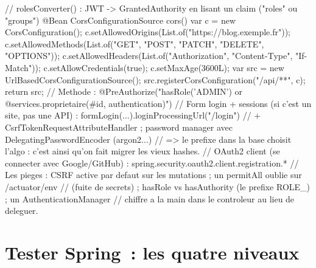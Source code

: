 \documentclass[12pt,a4paper,twoside,openright]{book}
\begin{document}
\begin{codejava}
{    // rolesConverter() : JWT -> GrantedAuthority en lisant un claim ("roles" ou "groups")
    @Bean
    CorsConfigurationSource cors() {
        var c = new CorsConfiguration();
        c.setAllowedOrigins(List.of("https://blog.exemple.fr"));
        c.setAllowedMethods(List.of("GET", "POST", "PATCH", "DELETE", "OPTIONS"));
        c.setAllowedHeaders(List.of("Authorization", "Content-Type", "If-Match"));
        c.setAllowCredentials(true); c.setMaxAge(3600L);
        var src = new UrlBasedCorsConfigurationSource(); src.registerCorsConfiguration("/api/**", c); return src;
    }
}
// Methode : @PreAuthorize("hasRole('ADMIN') or @services.proprietaire(#id, authentication)")
// Form login + sessions (si c'est un site, pas une API) : formLogin(...).loginProcessingUrl("/login")
//   + CsrfTokenRequestAttributeHandler ; password manager avec DelegatingPasswordEncoder ({argon2}...)
//   => le prefixe dans la base choisit l'algo : c'est ainsi qu'on fait migrer les vieux hashes.
// OAuth2 client (se connecter avec Google/GitHub) : spring.security.oauth2.client.registration.*
// Les pieges : CSRF active par defaut sur les mutations ; un permitAll oublie sur /actuator/env
//   (fuite de secrets) ; hasRole vs hasAuthority (le prefixe ROLE_) ; un AuthenticationManager
//   chiffre a la main dans le controleur au lieu de deleguer.
\end{codejava}

\section{Tester Spring~: les quatre niveaux}
\end{document}

